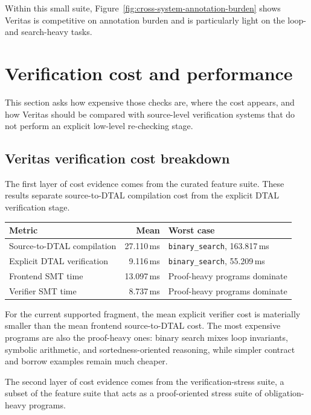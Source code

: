 Within this small suite, Figure~\ref{fig:cross-system-annotation-burden} shows Veritas is competitive on annotation burden and is particularly light on the loop- and search-heavy tasks.



\section{Verification cost and performance}\label{sec:verification-perf}

This section asks how expensive those checks are, where the cost appears, and how Veritas should be compared with source-level verification systems that do not perform an explicit low-level re-checking stage.

\subsection{Veritas verification cost breakdown}

The first layer of cost evidence comes from the curated feature suite. These results separate source-to-DTAL compilation cost from the explicit DTAL verification stage.

\begin{center}
\small
\begin{tabularx}{0.88\textwidth}{>{\raggedright\arraybackslash}p{} r >{\raggedright\arraybackslash}X}
\toprule
\textbf{Metric} & \textbf{Mean} & \textbf{Worst case} \\
\midrule
Source-to-DTAL compilation & 27.110\,ms & \texttt{binary\_search}, 163.817\,ms \\
Explicit DTAL verification & 9.116\,ms & \texttt{binary\_search}, 55.209\,ms \\
Frontend SMT time & 13.097\,ms & Proof-heavy programs dominate \\
Verifier SMT time & 8.737\,ms & Proof-heavy programs dominate \\
\bottomrule
\end{tabularx}
\end{center}

For the current supported fragment, the mean explicit verifier cost is materially smaller than the mean frontend source-to-DTAL cost. The most expensive programs are also the proof-heavy ones: binary search mixes loop invariants, symbolic arithmetic, and sortedness-oriented reasoning, while simpler contract and borrow examples remain much cheaper.

The second layer of cost evidence comes from the verification-stress suite, a subset of the feature suite that acts as a proof-oriented stress suite of obligation-heavy programs.


